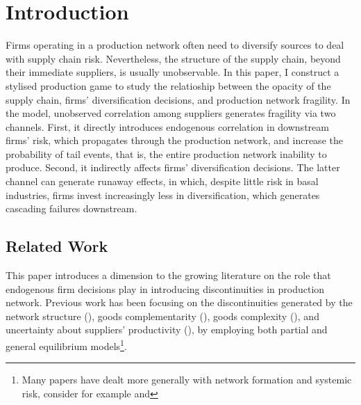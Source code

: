 \documentclass[../../main.tex]{subfiles}
\begin{document}
\section{Introduction}

\iffalse
\notes{
  \begin{enumerate}
    \item Research question
    \item Contribution to the literature
    \item Why do we care?
  \end{enumerate}
}
\fi

Firms operating in a production network often need to diversify sources to deal with supply chain risk. Nevertheless, the structure of the supply chain, beyond their immediate suppliers, is usually unobservable. In this paper, I construct a stylised production game to study the relatioship between the opacity of the supply chain, firms' diversification decisions, and production network fragility. In the model, unobserved correlation among suppliers generates fragility via two channels. First, it directly introduces endogenous correlation in downstream firms' risk, which propagates through the production network, and increase the probability of tail events, that is, the entire production network inability to produce. Second, it indirectly affects firms' diversification decisions. The latter channel can generate runaway effects, in which, despite little risk in basal industries, firms invest increasingly less in diversification, which generates cascading failures downstream.

\subsection{Related Work}

This paper introduces a dimension to the growing literature on the role that endogenous firm decisions play in introducing discontinuities in production network. Previous work has been focusing on the discontinuities generated by the network structure (\cite{baqaee_macroeconomic_2019}), goods complementarity (\cite{acemoglu_endogenous_2020}), goods complexity (\cite{elliott_supply_2022}), and uncertainty about suppliers' productivity (\cite{kopytov_endogenous_2021}), by employing both partial and general equilibrium models\footnote{Many papers have dealt more generally with network formation and systemic risk, consider for example  and }.
\end{document}
